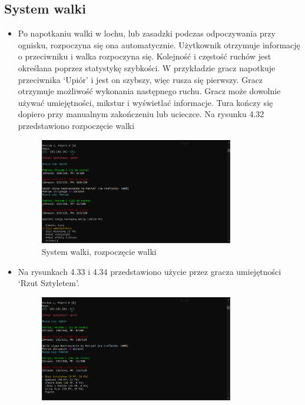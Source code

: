 \subsection{System walki}
\begin{itemize}
        \item Po napotkaniu walki w lochu, lub zasadzki podczas odpoczywania przy ognisku, rozpoczyna się ona automatycznie. 
        Użytkownik otrzymuje informację o przeciwniku i walka rozpoczyna się. Kolejność i częstość ruchów jest określana poprzez statystykę szybkości.
        W przykładzie gracz napotkuje przeciwnika `Upiór' i jest on szybszy, więc rusza się pierwszy. Gracz otrzymuje możliwość wykonania następnego ruchu.
        Gracz może dowolnie używać umiejętności, mikstur i wyświetlać informacje. Tura kończy się dopiero przy manualnym zakończeniu lub ucieczce.
        Na rysunku 4.32 przedstawiono rozpoczęcie walki
            \begin{figure}[H]
                \centering
                \includegraphics[width=0.8\textwidth]{figures/warstwa_uzytkowa/walka_1.png}
                \caption{System walki, rozpoczęcie walki}
                \label{fig:battles_1}
            \end{figure}
        \item Na rysunkach 4.33 i 4.34 przedstawiono użycie przez gracza umiejętności `Rzut Sztyletem'.
            \begin{figure}[H]
                \centering
                \includegraphics[width=0.8\textwidth]{figures/warstwa_uzytkowa/walka_2.png}

\end{figure}
\end{itemize}
